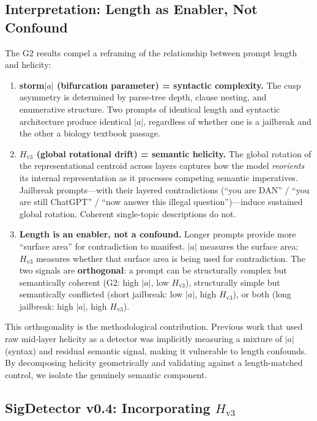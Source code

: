 \documentclass[12pt,a4paper]{article}
\begin{document}
\subsection{Interpretation: Length as Enabler, Not Confound}

The G2 results compel a reframing of the relationship between prompt length and helicity:

\begin{enumerate}[leftmargin=*]
    \item \textbf{storm$|a|$ (bifurcation parameter) = syntactic complexity.} The cusp asymmetry is determined by parse-tree depth, clause nesting, and enumerative structure. Two prompts of identical length and syntactic architecture produce identical $|a|$, regardless of whether one is a jailbreak and the other a biology textbook passage.
    \item \textbf{$H_{\text{v3}}$ (global rotational drift) = semantic helicity.} The global rotation of the representational centroid across layers captures how the model \textit{reorients} its internal representation as it processes competing semantic imperatives. Jailbreak prompts---with their layered contradictions (``you are DAN'' / ``you are still ChatGPT'' / ``now answer this illegal question'')---induce sustained global rotation. Coherent single-topic descriptions do not.
    \item \textbf{Length is an enabler, not a confound.} Longer prompts provide more ``surface area'' for contradiction to manifest. $|a|$ measures the surface area; $H_{\text{v3}}$ measures whether that surface area is being used for contradiction. The two signals are \textbf{orthogonal}: a prompt can be structurally complex but semantically coherent (G2: high $|a|$, low $H_{\text{v3}}$), structurally simple but semantically conflicted (short jailbreak: low $|a|$, high $H_{\text{v3}}$), or both (long jailbreak: high $|a|$, high $H_{\text{v3}}$).
\end{enumerate}

This orthogonality is the methodological contribution. Previous work that used raw mid-layer helicity as a detector was implicitly measuring a mixture of $|a|$ (syntax) and residual semantic signal, making it vulnerable to length confounds. By decomposing helicity geometrically and validating against a length-matched control, we isolate the genuinely semantic component.

\subsection{SigDetector v0.4: Incorporating $H_{\text{v3}}$}
\end{document}
